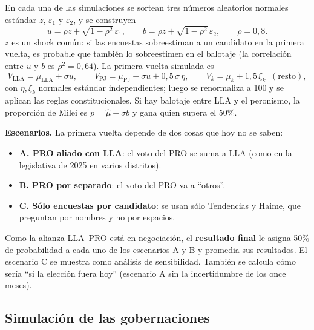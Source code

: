 \documentclass{article}
\begin{document}
En cada una de las \nSim{} simulaciones se sortean tres números aleatorios
normales estándar $z$, $\varepsilon_1$ y $\varepsilon_2$, y se construyen
\begin{equation}
  u = \rho z + \sqrt{1-\rho^2}\,\varepsilon_1, \qquad
  b = \rho z + \sqrt{1-\rho^2}\,\varepsilon_2, \qquad \rho = 0{,}8 .
\end{equation}
$z$ es un shock común: si las encuestas sobreestiman a un candidato en la
primera vuelta, es probable que también lo sobreestimen en el balotaje (la
correlación entre $u$ y $b$ es $\rho^2 = 0{,}64$). La primera vuelta simulada es
\begin{equation}
  V_{\text{LLA}} = \mu_{\text{LLA}} + \sigma u, \qquad
  V_{\text{PJ}} = \mu_{\text{PJ}} - \sigma u + 0{,}5\,\sigma\,\eta, \qquad
  V_{k} = \mu_{k} + 1{,}5\,\xi_k \;\;(\text{resto}),
\end{equation}
con $\eta, \xi_k$ normales estándar independientes; luego se renormaliza a 100 y
se aplican las reglas constitucionales. Si hay balotaje entre LLA y el
peronismo, la proporción de Milei es $p = \hat{\mu} + \sigma b$ y gana quien
supera el 50\%.

\textbf{Escenarios.} La primera vuelta depende de dos cosas que hoy no se saben:
\begin{itemize}
  \item \textbf{A. PRO aliado con LLA}: el voto del PRO se suma a LLA (como en
        la legislativa de 2025 en varios distritos).
  \item \textbf{B. PRO por separado}: el voto del PRO va a ``otros''.
  \item \textbf{C. Sólo encuestas por candidato}: se usan sólo Tendencias y Haime,
        que preguntan por nombres y no por espacios.
\end{itemize}
Como la alianza LLA--PRO está en negociación, el \textbf{resultado final} le
asigna 50\% de probabilidad a cada uno de los escenarios A y B y promedia sus
resultados. El escenario C se muestra como análisis de sensibilidad. También se
calcula cómo sería ``si la elección fuera hoy'' (escenario A sin la
incertidumbre de los once meses).

\subsection{Simulación de las gobernaciones}
\label{sec:prov}
\end{document}
